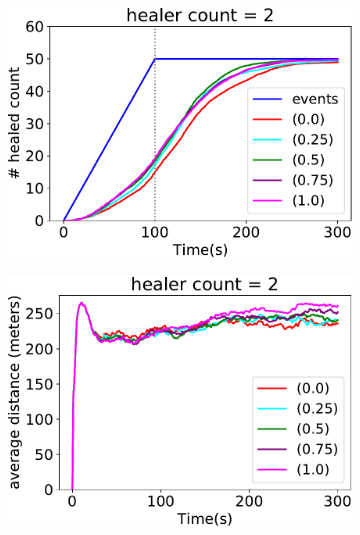 \begin{figure}
\centering
\begin{subfigure}[b]{0.32\textwidth}
\centering
\includegraphics[width=\textwidth]{papers/mdpi2020/imgs/healed-2.pdf}
\end{subfigure}
\hfill
%
\begin{subfigure}[b]{0.32\textwidth}
\centering
\includegraphics[width=\textwidth]{papers/mdpi2020/imgs/avg-distance-from-leader-2.pdf}
\end{subfigure}
\hfill
%
\begin{subfigure}[b]{0.32\textwidth}
\centering

\end{subfigure}
\end{figure}
